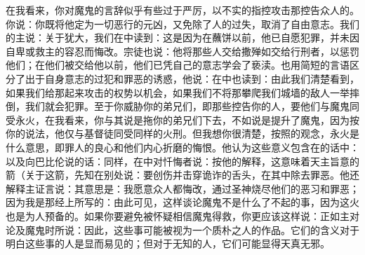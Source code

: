 \par

在我看来，你对魔鬼的言辞似乎有些过于严厉，以不实的指控攻击那控告众人的。你说：你既将他定为一切恶行的元凶，又免除了人的过失，取消了自由意志。我们的主说：关于犹大，我们在中读到：这是因为在蘸饼以前，他已自愿犯罪，并未因自卑或救主的容忍而悔改。宗徒也说：他将那些人交给撒殚如交给行刑者，以惩罚他们；在他们被交给他以前，他们已凭自己的意志学会了亵渎。也用简短的言语区分了出于自身意志的过犯和罪恶的诱惑，他说：在中也读到：由此我们清楚看到，如果我们给那起来攻击的权势以机会，如果我们不将那攀爬我们城墙的敌人一举摔倒，我们就会犯罪。至于你威胁你的弟兄们，即那些控告你的人，要他们与魔鬼同受永火，在我看来，你与其说是拖你的弟兄们下去，不如说是提升了魔鬼，因为按你的说法，他仅与基督徒同受同样的火刑。但我想你很清楚，按照的观念，永火是什么意思，即罪人的良心和他们内心折磨的悔恨。他认为这些意义包含在的话中：以及向巴比伦说的话：同样，在中对忏悔者说：按他的解释，这意味着天主旨意的箭（关于这箭，先知在别处说：要创伤并击穿诡诈的舌头，在其中除去罪恶。他还解释主证言说：其意思是：我愿意众人都悔改，通过圣神烧尽他们的恶习和罪恶；因为我是那经上所写的：由此可见，这样谈论魔鬼不是什么了不起的事，因为这火也是为人预备的。如果你要避免被怀疑相信魔鬼得救，你更应该这样说：正如主对论及魔鬼时所说：因此，这些事可能被视为一个质朴之人的作品。它们的含义对于明白这些事的人是显而易见的；但对于无知的人，它们可能显得天真无邪。\par

